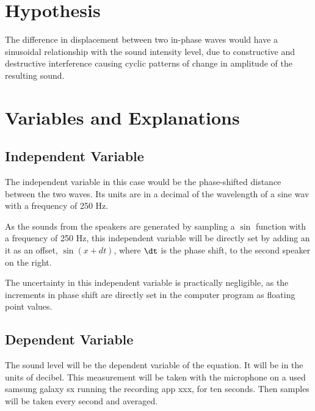 \documentclass[index]{subfiles}
\begin{document}
\section{Hypothesis}

The difference in displacement between two in-phase waves would have a sinusoidal relationship with the sound intensity level, due to constructive and destructive interference causing cyclic patterns of change in amplitude of the resulting sound.




\section{Variables and Explanations}

\subsection{Independent Variable}

The independent variable in this case would be the phase-shifted distance between the two waves. Its units are in a decimal of the wavelength of a sine wav with a frequency of 250 Hz.

As the sounds from the speakers are generated by sampling a \(\sin\) function with a frequency of 250 Hz, this independent variable will be directly set by adding an it as an offset, \(\sin(x + dt)\), where \(\dt\) is the phase shift, to the second speaker on the right.

The uncertainty in this independent variable is practically negligible, as the increments in phase shift are directly set in the computer program as floating point values.

\subsection{Dependent Variable}

The sound level will be the dependent variable of the equation. It will be in the units of decibel. This measurement will be taken with the microphone on a used samsung galaxy sx running the recording app xxx, for ten seconds. Then samples will be taken every second and averaged. 
\end{document}
